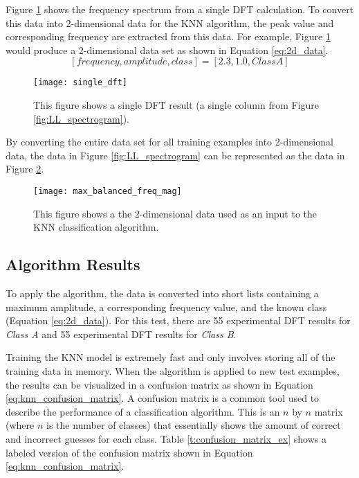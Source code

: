Figure \ref{fig:single_dft} shows the frequency spectrum from a single DFT calculation.  To convert this data into 2-dimensional data for the KNN algorithm, the peak value and corresponding frequency are extracted from this data.  For example, Figure \ref{fig:single_dft} would produce a 2-dimensional data set as shown in Equation \ref{eq:2d_data}.
\begin{equation} \label{eq:2d_data}
	[frequency, amplitude, class] = [2.3, 1.0, Class A]
\end{equation}

\begin{figure}
	\centering
	\texttt{[image: single\_dft]}
	\decoRule
	\caption{This figure shows a single DFT result (a single column from Figure \ref{fig:LL_spectrogram}).}
	\label{fig:single_dft}
\end{figure}

By converting the entire data set for all training examples into 2-dimensional data, the data in Figure \ref{fig:LL_spectrogram} can be represented as the data in Figure \ref{fig:max_balanced_freq_mag}.

\begin{figure}
	\centering
	\texttt{[image: max\_balanced\_freq\_mag]}
	\decoRule
	\caption{This figure shows a the 2-dimensional data used as an input to the KNN classification algorithm.}
	\label{fig:max_balanced_freq_mag}
\end{figure}


\subsection{Algorithm Results}
To apply the algorithm, the data is converted into short lists containing a maximum amplitude, a corresponding frequency value, and the known class (Equation \ref{eq:2d_data}). For this test, there are 55 experimental DFT results for \textit{Class A} and 55 experimental DFT results for \textit{Class B}. 

Training the KNN model is extremely fast and only involves storing all of the training data in memory.  When the algorithm is applied to new test examples, the results can be visualized in a confusion matrix \cite{confusion_matrix} as shown in Equation \ref{eq:knn_confusion_matrix}.  A confusion matrix is a common tool used to describe the performance of a classification algorithm.  This is an $n$ by $n$ matrix (where $n$ is the number of classes) that essentially shows the amount of correct and incorrect guesses for each class.  Table \ref{t:confusion_matrix_ex} shows a labeled version of the confusion matrix shown in Equation \ref{eq:knn_confusion_matrix}.

